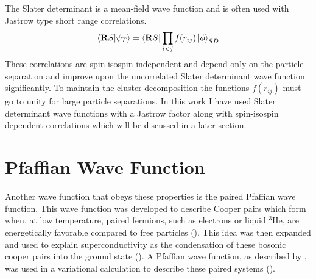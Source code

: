 
The Slater determinant is a mean-field wave function and is often used with Jastrow type short range correlations.
\begin{equation}
   \left< \mathbf{R} S | \psi_T \right> = \left< \mathbf{R} S \right|\prod\limits_{i<j}f(r_{ij}) \left| \phi \right>_{SD}
   \label{equ:jastrow}
\end{equation}
These correlations are spin-isospin independent and depend only on the particle separation and improve upon the uncorrelated Slater determinant wave function significantly. To maintain the cluster decomposition the functions $f(r_{ij})$ must go to unity for large particle separations. In this work I have used Slater determinant wave functions with a Jastrow factor along with spin-isospin dependent correlations which will be discussed in a later section.

\section{Pfaffian Wave Function}
Another wave function that obeys these properties is the paired Pfaffian wave function. This wave function was developed to describe Cooper pairs which form when, at low temperature, paired fermions, such as electrons or liquid $^3$He, are energetically favorable compared to free particles (\cite{cooper1956,leggett1975}). This idea was then expanded and used to explain superconductivity as the condensation of these bosonic cooper pairs into the ground state (\cite{bardeen1957,bardeen1957_2}). A Pfaffian wave function, as described by \cite{leggett1975}, was used in a variational calculation to describe these paired systems (\cite{bouchaud1988}).

